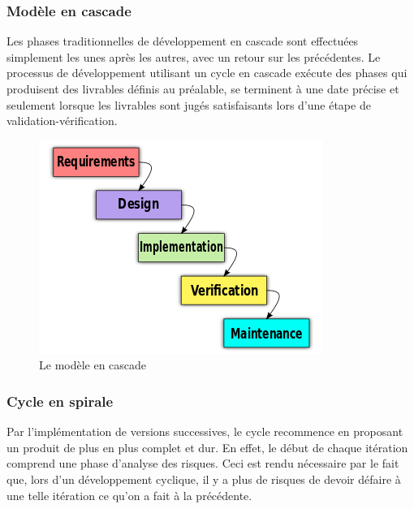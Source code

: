 \subsubsection{Modèle en cascade}

Les phases traditionnelles de développement en cascade sont effectuées simplement les unes après les autres, avec un retour sur les précédentes. Le processus de développement utilisant un cycle en cascade exécute des phases qui produisent des livrables définis au préalable, se terminent à une date précise et seulement lorsque les livrables sont jugés satisfaisants lors d'une étape de validation-vérification.

\begin{figure}[H]
\begin{center}
    \includegraphics[scale=0.5]{img/waterfall}
    \caption{Le modèle en cascade}
	\label{waterfall}
\end{center}
\end{figure}

\subsubsection{Cycle en spirale}

Par l'implémentation de versions successives, le cycle recommence en proposant un produit de plus en plus complet et dur. En effet, le début de chaque itération comprend une phase d'analyse des risques. Ceci est rendu nécessaire par le fait que, lors d'un développement cyclique, il y a plus de risques de devoir défaire à une telle itération ce qu'on a fait à la précédente.

